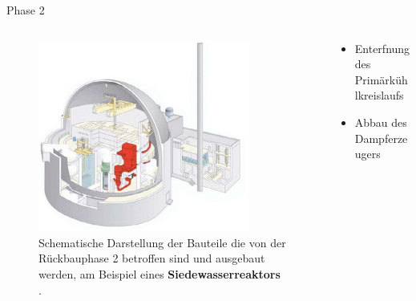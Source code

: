 \begin{frame}{Phase 2}
  \begin{columns}

    \begin{column}{0.48\textwidth}
      \begin{figure}
         \centering
         \includegraphics[width=0.85\textwidth]{./bilder/abbau_schritt_2.PNG}
         \caption{ Schematische Darstellung der Bauteile die von der Rückbauphase 2 betroffen sind und ausgebaut werden, am Beispiel eines \textbf{Siedewasserreaktors} \cite{stilllegung_grs}. }
         \label{ fig: phase_2 }
       \end{figure}
     \end{column}

     \begin{column}{0.48\textwidth}
       \begin{itemize}
         \setlength\itemsep{1.2em}
         \item{ Enterfnung des Primärkühlkreislaufs }
         \item{ Abbau des Dampferzeugers}
       \end{itemize}
     \end{column}

  \end{columns}
\end{frame}



